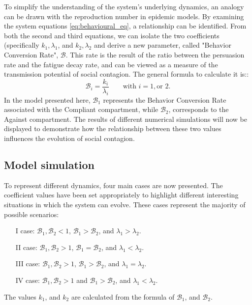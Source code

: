 To simplify the understanding of the system's underlying dynamics, an analogy can be drawn with the reproduction number in epidemic models. By examining the system equations \ref{eq:behavioural_eq}, a relationship can be identified. From both the second and third equations, we can isolate the two coefficients (specifically $k_1 , \lambda_1 $, and  $k_2 , \lambda_2 $ and derive a new parameter, called "Behavior Conversion Rate", $\mathcal{B}$. This rate is the result of the ratio between the persuasion rate and the fatigue decay rate, and can be viewed as a measure of the transmission potential of social contagion. The general formula to calculate it is::
\begin{equation}
	\mathcal{B}_i =\frac{ k_i }{\lambda_i}  \qquad \text{with } i = 1, \text{or } 2.
	\label{eq:behave_rate}
\end{equation}
In the model presented here, $\mathcal{B}_1$ represents the Behavior Conversion Rate associated with the Compliant compartment, while $\mathcal{B}_2$, corresponds to the Against compartment. The results of different numerical simulations will now be displayed to demonstrate how the relationship between these two values influences the evolution of social contagion.

\subsection{Model simulation}
To represent different dynamics, four main cases are now presented. The coefficient values have been set appropriately to highlight different interesting situations in which the system can evolve. These cases represent the majority of possible scenarios:

\begin{itemize}
	\item[I] case: $\mathcal{B}_1, \mathcal{B}_2 <1$, $\mathcal{B}_1 >  \mathcal{B}_2$, and $\lambda_1 > \lambda_2$.
	\item[II] case: $\mathcal{B}_1, \mathcal{B}_2 >1$, $\mathcal{B}_1 =  \mathcal{B}_2$, and $\lambda_1 < \lambda_2$.
	\item[III] case: $\mathcal{B}_1, \mathcal{B}_2 >1$, $\mathcal{B}_1 >  \mathcal{B}_2$, and $\lambda_1 = \lambda_2$.
	\item[IV] case: $\mathcal{B}_1, \mathcal{B}_2 >1$ and $\mathcal{B}_1 >  \mathcal{B}_2$, and $\lambda_1 < \lambda_2$.
\end{itemize}

The values $k_1$, and $k_2$ are calculated from the formula of $\mathcal{B}_1$, and $\mathcal{B}_2$.

